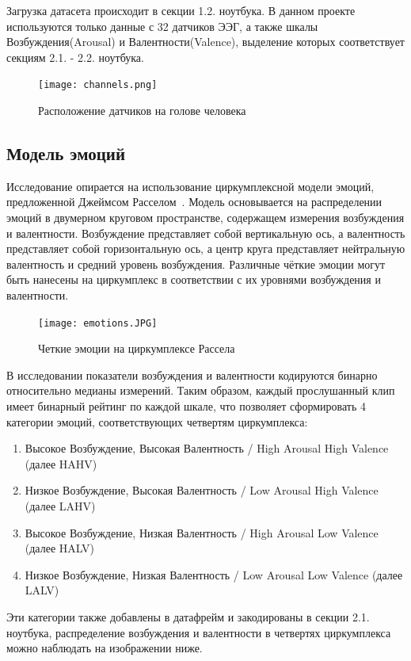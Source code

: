 \documentclass{article}
\begin{document}
Загрузка датасета происходит в секции 1.2. ноутбука. В данном проекте используются только данные с 32 датчиков ЭЭГ, а также шкалы Возбуждения(Arousal) и Валентности(Valence), выделение которых соответствует секциям 2.1. - 2.2. ноутбука.

\begin{figure}[h!]
\centering
\texttt{[image: channels.png]}
\caption{Расположение датчиков на голове человека}
\end{figure}

\subsection{Модель эмоций}
Исследование опирается на использование циркумплексной модели эмоций, предложенной Джеймсом Расселом~\cite{Russell}. Модель основывается на распределении эмоций в двумерном круговом пространстве, содержащем измерения возбуждения и валентности. Возбуждение представляет собой вертикальную ось, а валентность представляет собой горизонтальную ось, а центр круга представляет нейтральную валентность и средний уровень возбуждения. Различные чёткие эмоции могут быть нанесены на циркумплекс в соответствии с их уровнями возбуждения и валентности.

\begin{figure}[h!]
\centering
\texttt{[image: emotions.JPG]}
\caption{Четкие эмоции на циркумплексе Рассела}
\end{figure}

В исследовании показатели возбуждения и валентности кодируются бинарно относительно медианы измерений. Таким образом, каждый прослушанный клип имеет бинарный рейтинг по каждой шкале, что позволяет сформировать 4 категории эмоций, соответствующих четвертям циркумплекса:
\begin{enumerate}
    \item Высокое Возбуждение, Высокая Валентность / High Arousal High Valence (далее HAHV)
    \item Низкое Возбуждение, Высокая Валентность / Low Arousal High Valence (далее LAHV)
    \item Высокое Возбуждение, Низкая Валентность / High Arousal Low Valence (далее HALV)
    \item Низкое Возбуждение, Низкая Валентность / Low Arousal Low Valence (далее LALV)
\end{enumerate}
Эти категории также добавлены в датафрейм и закодированы в секции 2.1. ноутбука, распределение возбуждения и валентности в четвертях циркумплекса можно наблюдать на изображении ниже.
\end{document}
